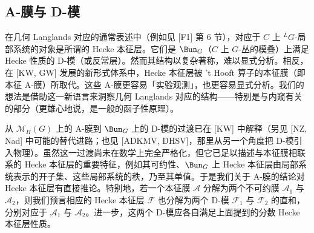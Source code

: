 
\subsection{A-膜与 D-模}

在几何 Langlands 对应的通常表述中（例如见 [F1] 第 6 节），对应于 $C$ 上 ${}^{L}G$-局部系统的对象是所谓的 Hecke 本征层。它们是 $\Bun_G$（$C$ 上 $G$-丛的模叠）上满足 Hecke 性质的 D-模（或反常层）。然而其结构以复杂著称，难以显式分析。相反，在 [KW, GW] 发展的新形式体系中，Hecke 本征层被 't Hooft 算子的本征膜（即本征 A-膜）所取代。这些 A-膜更容易「实验观测」，也更容易显式分析。我们的想法是借助这一新语言来洞察几何 Langlands 对应的结构——特别是与内窥有关的部分（更雄心地说，是一般的函子性原理）。

从 $\mathcal{M}_H(G)$ 上的 A-膜到 $\Bun_G$ 上的 D-模的过渡已在 [KW] 中解释（另见 [NZ, Nad] 中可能的替代进路；也见 [ADKMV, DHSV]，那里从另一个角度把 D-模引入物理）。虽然这一过渡尚未在数学上完全严格化，但它已足以描述与本征膜相联系的 Hecke 本征层的重要特征，例如其可约性、$\Bun_G$ 上 Hecke 本征层由局部系统表示的开子集、这些局部系统的秩，乃至其单值。于是我们关于 A-膜的结论对 Hecke 本征层有直接推论。特别地，若一个本征膜 $\mathcal{A}$ 分解为两个不可约膜 $\mathcal{A}_1$ 与 $\mathcal{A}_2$，则我们预言相应的 Hecke 本征层 $\mathcal{F}$ 也分解为两个 D-模 $\mathcal{F}_1$ 与 $\mathcal{F}_2$ 的直和，分别对应于 $\mathcal{A}_1$ 与 $\mathcal{A}_2$。进一步，这两个 D-模应各自满足上面提到的分数 Hecke 本征层性质。


